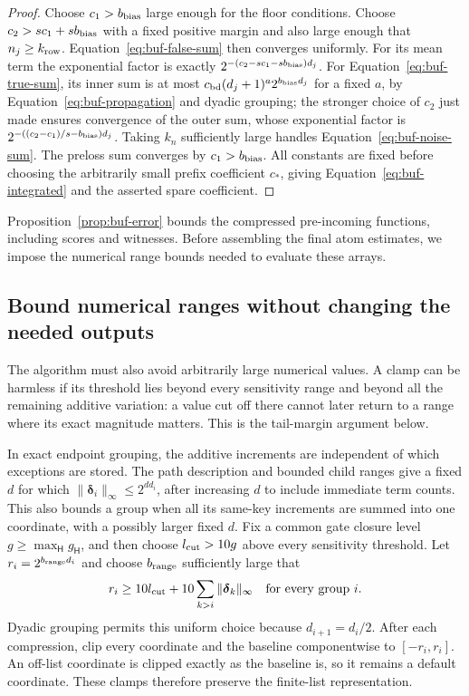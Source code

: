 \documentclass[11pt]{article}
\numberwithin{equation}{section}
\theoremstyle{definition}
\theoremstyle{remark}
\begin{document}
\begin{proof}
Choose $c_1>{b_{\rm bias}}$ large enough for the floor conditions.  Choose
$c_2>sc_1+s{b_{\rm bias}}$ with a fixed positive margin and also large enough that
$n_j\geq {k_{\rm row}}$.  Equation~\eqref{eq:buf-false-sum} then converges uniformly.
For its mean term the exponential factor is exactly
$2^{-(c_2-sc_1-s{b_{\rm bias}})d_j}$.
For Equation~\eqref{eq:buf-true-sum}, its inner sum is at most
${c_{\rm bd}}(d_j+1)^{a}2^{{b_{\rm bias}}d_j}$ for a fixed ${a}$, by
Equation~\eqref{eq:buf-propagation} and dyadic grouping; the stronger
choice of $c_2$ just made ensures convergence of the outer sum, whose
exponential factor is
$2^{-((c_2-c_1)/s-{b_{\rm bias}})d_j}$.
Taking ${k}_n$ sufficiently large handles Equation~\eqref{eq:buf-noise-sum}.
The preloss sum converges by $c_1>{b_{\rm bias}}$.  All constants are fixed before
choosing the arbitrarily small prefix coefficient $c_*$, giving
Equation~\eqref{eq:buf-integrated} and the asserted spare coefficient.
\end{proof}

Proposition~\ref{prop:buf-error} bounds the compressed pre-incoming
functions, including scores and witnesses.  Before assembling the final
atom estimates, we impose the numerical range bounds needed to evaluate
these arrays.

\subsection{Bound numerical ranges without changing the needed outputs}

The algorithm must also avoid arbitrarily large numerical values. A clamp can be harmless if its threshold lies beyond every sensitivity range and beyond all the remaining additive variation: a value cut off there cannot later return to a range where its exact magnitude matters. This is the tail-margin argument below.

In exact endpoint grouping, the additive increments are independent of
which exceptions are stored.  The path description and bounded child
ranges give a fixed ${d}$ for which
$\|\boldsymbol{\delta}_i\|_\infty\leq2^{{d}d_i}$, after increasing ${d}$ to include
immediate term counts.  This also bounds a group when all its same-key
increments are summed into one coordinate, with a possibly larger fixed
${d}$.  Fix a common gate closure level ${g}\ge\max_{\mathsf{H}} g_{\mathsf{H}}$, and then
choose ${l_{\rm cut}}>10{g}$ above every sensitivity threshold.  Let
${r}_i=2^{{b_{\rm range}}d_i}$ and choose ${b_{\rm range}}$ sufficiently large that
\begin{equation}
 {r}_i\geq 10{l_{\rm cut}}+10\sum_{k>i}\|\boldsymbol{\delta}_k\|_\infty
 \quad\text{for every group }i.
 \label{eq:buf-clamp-margin}
\end{equation}
Dyadic grouping permits this uniform choice because $d_{i+1}=d_i/2$.
After each compression, clip every coordinate and the baseline
componentwise to $[-{r}_i,{r}_i]$.
An off-list coordinate is clipped exactly as the baseline is, so it
remains a default coordinate.  These clamps therefore preserve the
finite-list representation.
\end{document}
